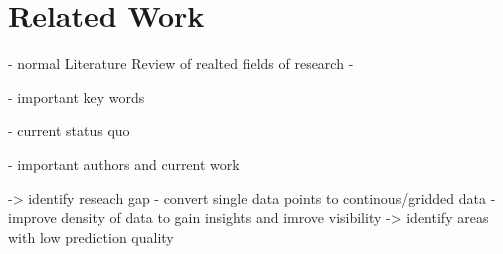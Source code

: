 \chapter{Related Work}
\label{chap:Related Work}

- normal Literature Review of realted fields of research
 - 

- important key words

- current status quo

- important authors and current work

-> identify reseach gap
- convert single data points to continous/gridded data
- improve density of data to gain insights and imrove visibility -> identify areas with low prediction quality